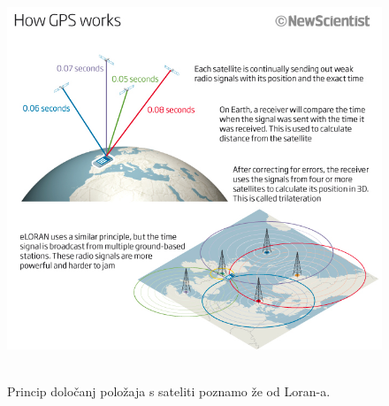 \begin{figure}
	\centering
	\includegraphics[height=12cm]{Predavanja/05_SatLastPolozaj/figs/dn20202691.jpg}
	\caption{Princip določanj položaja s sateliti poznamo že od Loran-a.}
	\label{fig:Gnss_Polozaj:GnssLorPrinc}
\end{figure}




